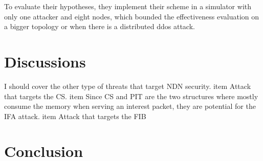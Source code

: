 \documentclass[conference]{IEEEtran}
\begin{document}
To evaluate their hypotheses, they implement their scheme in a simulator with only one attacker and eight nodes, which bounded the effectiveness evaluation on a bigger topology or when there is a distributed ddos attack. 


\cite{Tourani2018}
\cite{Bhattacharyya2018}
\cite{Chhetry2016}
\cite{Abdallah2015}
\cite{Chen2015}

\cite{Zhang:2014:NDN:2656877.2656887}
\cite{Compagno2013}


\cite{Xin2016ANI}
\cite{Chhetry2016}

\cite{8247232}
\cite{Zhao2018}
\cite{8352953}
\cite{8452848}

\section{Discussions}

\cite{Abdallah2015}
\cite{Chen2015}
\cite{Smetters2009}
\cite{Ahlgren2012}
\cite{Universite2018}

    I should cover the other type of threats that target NDN security. 
    item Attack that targets the CS.
    item Since CS and PIT are the two structures where mostly consume the memory when serving an interest packet, they are potential for the IFA attack. 
    item Attack that targets the FIB 

\section{Conclusion}






\end{document}
